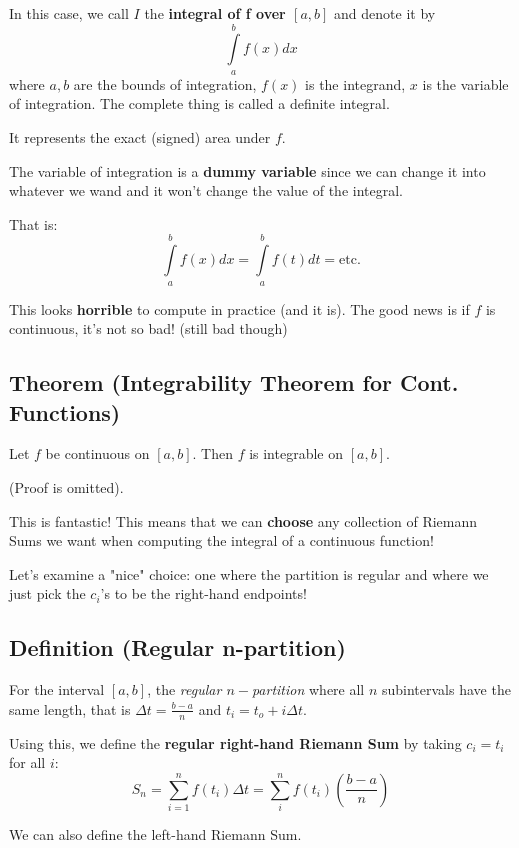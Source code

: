In this case, we call $ I $ the \textbf{integral of f over $ [a,b] $ } and denote it by 
\[ \int\limits_{a}^{b} f(x) dx \]
where $ a,b $ are the bounds of integration, $ f(x) $ is the integrand, $ x $ is the
variable of integration. The complete thing is called a definite integral.

It represents the exact (signed) area under $ f $.

\begin{remark}
    The variable of integration is a \textbf{dummy variable} since we can change it into
    whatever we wand and it won't change the value of the integral.

    That is: 
    \[
        \int\limits_{a}^{b} f(x) dx =
        \int\limits_{a}^{b} f(t) d{t} = \text{etc.}
    \]
\end{remark}

This looks \textbf{horrible} to compute in practice (and it is). The good news is if
$ f $ is continuous, it's not so bad! (still bad though)

\subsection{Theorem (Integrability Theorem for Cont. Functions)}
Let $ f $ be continuous on $ [a,b] $. Then $ f $ is integrable on $ [a,b] $.

(Proof is omitted).

This is fantastic! This means that we can \textbf{choose} any collection of Riemann Sums
we want when computing the integral of a continuous function!

Let's examine a "nice" choice: one where the partition is regular and where we just
pick the $ c_i $'s to be the right-hand endpoints!

\subsection{Definition (Regular n-partition)}
For the interval $ [a,b] $, the \emph{regular $n-$partition} where all $ n $ subintervals
have the same length, that is $ \Delta t=\frac{b-a}{n} $ and $ t_i=t_o+i\Delta t $.

Using this, we define the \textbf{regular right-hand Riemann Sum} by taking $ c_i=t_i $ for
all $ i $:
\[ S_n=\sum\limits_{i=1}^{n} f(t_i)\Delta t=\sum\limits_{i}^{n} f(t_i)\left(\frac{b-a}{n}\right) \]

\begin{remark}
    We can also define the left-hand Riemann Sum.
\end{remark}

